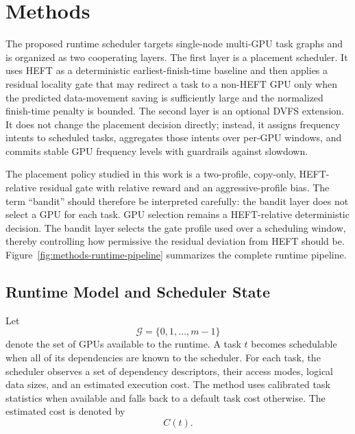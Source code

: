 
\chapter{Methods}
\label{chap:methods}

The proposed runtime scheduler targets single-node multi-GPU \CUDASTF{} task graphs and is organized as two cooperating layers. The first layer is a placement scheduler. It uses HEFT as a deterministic earliest-finish-time baseline and then applies a residual locality gate that may redirect a task to a non-HEFT GPU only when the predicted data-movement saving is sufficiently large and the normalized finish-time penalty is bounded. The second layer is an optional DVFS extension. It does not change the placement decision directly; instead, it assigns frequency intents to scheduled tasks, aggregates those intents over per-GPU windows, and commits stable GPU frequency levels with guardrails against slowdown.

The placement policy studied in this work is a two-profile, copy-only, HEFT-relative residual gate with relative reward and an aggressive-profile bias. The term ``bandit'' should therefore be interpreted carefully: the bandit layer does not select a GPU for each task. GPU selection remains a HEFT-relative deterministic decision. The bandit layer selects the gate profile used over a scheduling window, thereby controlling how permissive the residual deviation from HEFT should be. Figure~\ref{fig:methods-runtime-pipeline} summarizes the complete runtime pipeline.

\figMethodsRuntimePipeline

\section{Runtime Model and Scheduler State}
\label{sec:methods-runtime-model}

Let
\begin{equation}
\mathcal{G}=\{0,1,\ldots,m-1\}
\end{equation}
denote the set of GPUs available to the runtime. A task $t$ becomes schedulable when all of its \CUDASTF{} dependencies are known to the scheduler. For each task, the scheduler observes a set of dependency descriptors, their access modes, logical data sizes, and an estimated execution cost. The method uses calibrated task statistics when available and falls back to a default task cost otherwise. The estimated cost is denoted by
\begin{equation}
C(t).
\end{equation}

